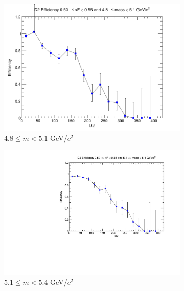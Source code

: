 \documentclass[11pt]{article}
\begin{document}
\begin{figure}[p]
\begin{subfigure}[b]{0.32\textwidth}
        \includegraphics[width=\textwidth]{./kTrackerEfficiencyPlots/D2_Efficiency_xF10_mass2.png}
        \caption{$4.8 \leq m < 5.1$ GeV/$c^2$}
    \end{subfigure}\vspace{0.5cm}
    \begin{subfigure}[b]{0.32\textwidth}
        \centering
        \includegraphics[width=\textwidth]{./kTrackerEfficiencyPlots/D2_Efficiency_xF10_mass3.pdf}
        \caption{$5.1 \leq m < 5.4$ GeV/$c^2$}
    \end{subfigure}\hfill
    \begin{subfigure}[b]{0.32\textwidth}
        \centering

\end{subfigure}
\end{figure}
\end{document}
